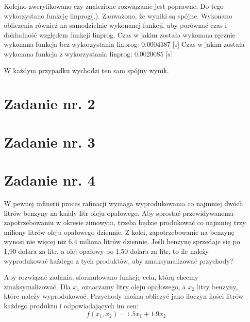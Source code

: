 \documentclass{article}
\begin{document}
Kolejno zweryfikowano czy znalezione rozwiązanie jest poprawne. Do tego wykorzystano funkcję
linprog(.). Zauważono, że wyniki są spójne. Wykonano obliczenia również na samodzielnie wykonanej funkcji, aby porównać czas i dokładność względem funkcji linprog.
\newline
Czas w jakim została wykonana ręcznie wykonana funkcja bez wykorzystania linprog: 0.0004387 [s]\newline
Czas w jakim została wykonana funkcja z wykorzystania linprog: 0.0020085 [s]\newline

W każdym przypadku wychodzi ten sam spójny wynik.
\section{Zadanie nr. 2}

\section{Zadanie nr. 3}

\section{Zadanie nr. 4}
W pewnej rafinerii proces rafinacji wymaga wyprodukowania co najmniej dwóch
litrów benzyny na każdy litr oleju opałowego. Aby sprostać przewidywanemu zapotrzebowaniu
w okresie zimowym, trzeba będzie produkować co najmniej trzy miliony litrów oleju
opałowego dziennie. Z kolei, zapotrzebowanie na benzynę wynosi nie więcej niż 6,4 miliona
litrów dziennie. Jeśli benzynę sprzedaje się po 1,90 dolara za litr, a olej opałowy po 1,50 dolara
za litr, to ile należy wyprodukować każdego z tych produktów, aby zmaksymalizować
przychody?
\newline

Aby rozwiązać zadania, sformułowano funkcję celu, którą chcemy zmaksymalizować. Dla $x_1$ oznaczamy litry oleju opałowego, 
a $x_2$ litry benzyny, które należy wyprodukować. Przychody można obliczyć jako iloczyn ilości litrów każdego produktu i odpowiadających im cen:
\begin{equation}
   f(x_1,x_2)=1.5x_1 + 1.9x_2 
\end{equation}
\end{document}
